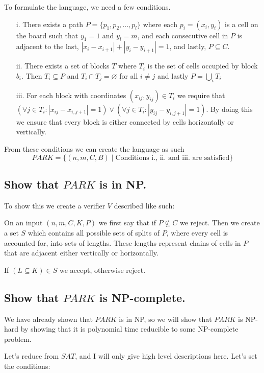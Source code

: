 \documentclass{article}
\begin{document}
	To formulate the language, we need a few conditions.
	\begin{itemize}
		\item[i.] There exists a path $P = \{p_1,p_2,...,p_l\}$ where 
			each $p_i = (x_i,y_i)$ is a cell on the board such that 
			$y_1 = 1$ and $y_l = m$, and each consecutive cell in $P$ is 
			adjacent to the last, $|x_i - x_{i+1}| + |y_i - y_{i+1}| = 1$, 
			and lastly, $P\subseteq C$.
		\item[ii.] There exists a set of blocks $T$ where $T_i$ is the 
			set of cells occupied by block $b_i$. Then $T_i\subseteq P$ and 
			$T_i\cap T_j = \varnothing$ for all $i\neq j$ and lastly 
			$P = \bigcup\limits_{i}T_i$
		\item[iii.] For each block with coordinates $(x_{ij},y_{ij})\in T_i$ 
			we require that \\$(\forall j\in T_i: |x_{ij} - x_{i,j+1}| = 1) 
			\vee  (\forall j\in T_i: |y_{ij} - y_{i,j+1}| = 1)$. By 
			doing this we ensure that every block is either connected by 
			cells horizontally or vertically.
	\end{itemize}
	From these conditions we can create the language as such
	\begin{equation}
		PARK = \{(n,m,C,B)\mid \text{Conditions i., ii. and iii. are satisfied}\}
		\label{eq:gamerere}
	\end{equation}
	\subsection{Show that $PARK$ is in NP.}
	To show this we create a verifier $V$ described like such:

	On an input $(n,m,C,K,P)$ we first say that if $P\nsubseteq C$ we reject. 
	Then we create a set $S$ which contains all possible sets of 
	splits of $P$, where every cell is accounted for, into sets of lengths. These lengths represent chains of
	cells in $P$ that are adjacent either vertically or horizontally.

	If $(L\subseteq K)\in S$ we accept, otherwise reject.
	\newpage
	\subsection{Show that $PARK$ is NP-complete.}
	We have already shown that $PARK$ is in NP, so we will show that 
	$PARK$ is NP-hard by showing that it is polynomial time reducible to 
	some NP-complete problem. 

	Let's reduce from $SAT$, and I will only give high level descriptions 
	here. Let's set the conditions:
\end{document}
